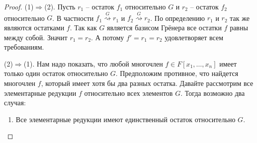 \begin{proof}
(1)$\Rightarrow$(2).
Пусть $r_1$ -- остаток $f_1$ относительно $G$ и $r_2$ -- остаток $f_2$ относительно $G$.
В частности $f_1 \stackrel{G}{\rightsquigarrow} r_1$ и $f_2 \stackrel{G}{\rightsquigarrow} r_2$.
По определению $r_1$ и $r_2$ так же являются остатками $f$.
Так как $G$ является базисом Грёнера все остатки $f$ равны между собой.
Значит $r_1 = r_2$.
А потому $f' = r_1 = r_2$ удовлетворяет всем требованиям.

(2)$\Rightarrow$(1).
Нам надо показать, что любой многочлен $f\in F[x_1,\ldots,x_n]$ имеет только один остаток относительно $G$.
Предположим противное, что найдется многочлен $f$, который имеет хотя бы два разных остатка.
Давайте рассмотрим все элементарные редукции $f$ относительно всех элементов $G$.
Тогда возможно два случая:
\begin{enumerate}
\item Все элементарные редукции имеют единственный остаток относительно $G$.


\end{enumerate}
\end{proof}
